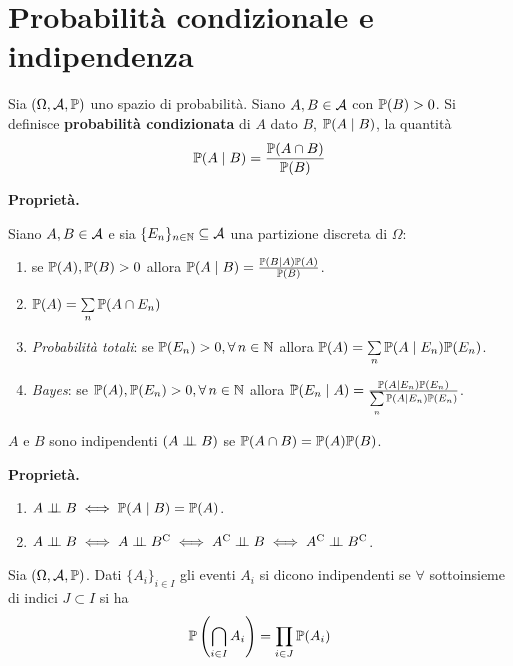 
\chapter{Probabilità condizionale e indipendenza}

\ParteEsercizi

\begin{defn}
	Sia $(\Omega,\mathcal{A},\mathbb{P})$ uno spazio di probabilità. Siano $A,B\in \mathcal{A}$ con $\mathbb{P}(B)  >0$. Si definisce \textbf{probabilità condizionata} di $A$ dato $B$, $\mathbb{P}(A\mid B)$, la quantità
	\begin{equation*}
		\mathbb{P}(A\mid B) =\frac{\mathbb{P}(A\cap B)}{\mathbb{P}(B)}
	\end{equation*}
\end{defn}
\textbf{Proprietà.}

Siano $A,B\in \mathcal{A}$ e sia $\{E_{n}\}_{n\in \mathbb{N}} \subseteq \mathcal{A}$ una partizione discreta di $\Omega $:
\begin{enumerate}
	\item se $\mathbb{P}(A) ,\mathbb{P}(B)  >0$ allora $\mathbb{P}(A\mid B) =\frac{\mathbb{P}(B\mid A)\mathbb{P}(A)}{\mathbb{P}(B)}$.
	\item $\mathbb{P}(A) =\sum\limits_{n}\mathbb{P}(A\cap E_{n})$
	\item \textit{Probabilità totali}: se $\PP(E_{n})  >0,\forall n\in \NN$ allora $\mathbb{P}(A) =\sum\limits_{n}\mathbb{P}(A\mid E_{n})\mathbb{P}(E_{n})$.
	\item \textit{Bayes}: se $\PP(A) ,\PP(E_{n})  >0,\forall n\in \NN$ allora $\mathbb{P}(E_{n} \mid A) =\frac{\mathbb{P}(A\mid E_{n})\mathbb{P}(E_{n})}{\sum\limits_{n}\mathbb{P}(A\mid E_{n})\mathbb{P}(E_{n})}$.
\end{enumerate}
\begin{defn}
$A$ e $B$ sono indipendenti $(A\perp \!\!\! \perp B)$ se $\mathbb{P}(A\cap B) =\mathbb{P}(A)\mathbb{P}(B)$.
\end{defn}
\textbf{Proprietà.}
\begin{enumerate}
\item $A\perp \!\!\! \perp B\iff \mathbb{P}(A\mid B) =\mathbb{P}(A)$.
\item $A\indep B\iff A\indep B\complementary \iff A\complementary \indep B\iff A\complementary \indep B\complementary$.
\end{enumerate}
\begin{defn}
	Sia $(\Omega,\mathcal{A},\mathbb{P})$. Dati $\{A_{i}\}_{i\in I}$ gli eventi $A_{i}$ si dicono indipendenti se $\forall $ sottoinsieme di indici $J\subset I$ si ha
	\begin{equation*}
		\mathbb{P}\left(\bigcap_{i\in I} A_{i}\right) =\prod_{i\in J}\mathbb{P}(A_{i})
	\end{equation*}
\end{defn}

